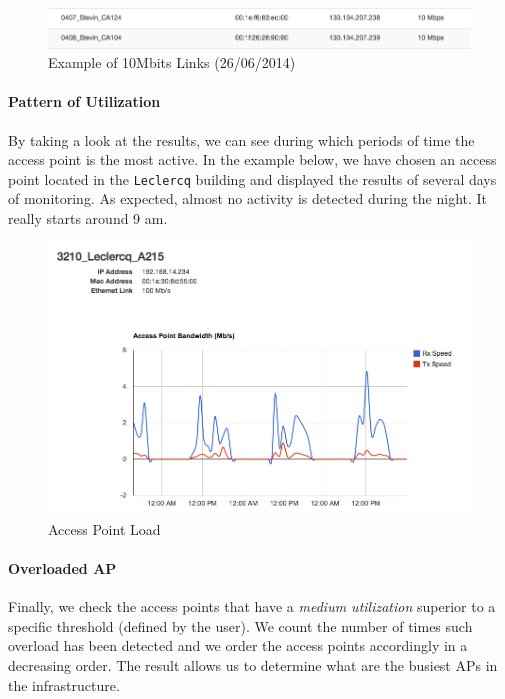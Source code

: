 \begin{figure}[H]
   \includegraphics[width=\textwidth]{Pictures/chapter5/slowLinks.png}
   \caption{Example of 10Mbits Links (26/06/2014)}
\end{figure}

\paragraph*{Pattern of Utilization} By taking a look at the results, we can see during which periods of time the access point is the most active. In the example below, we have chosen an access point located in the \texttt{Leclercq} building and displayed the results of several days of monitoring. As expected, almost no activity is detected during the night. It really starts around 9 am. 

\begin{figure}[H]
   \includegraphics[width=\textwidth]{Pictures/chapter5/apLoad.png}
   \caption{Access Point Load}
\end{figure}

\paragraph*{Overloaded AP} Finally, we check the access points that have a \emph{medium utilization} superior to a specific threshold (defined by the user). We count the number of times such overload has been detected and we order the access points accordingly in a decreasing order. The result allows us to determine what are the busiest APs in the infrastructure.

